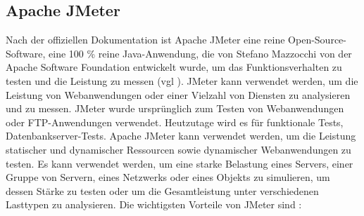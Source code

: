 \subsection{Apache JMeter}


Nach der offiziellen Dokumentation ist Apache JMeter eine reine
Open-Source-Software, eine 100 \% reine Java-Anwendung, die von Stefano
Mazzocchi von der Apache Software Foundation entwickelt wurde, um das
Funktionsverhalten zu testen und die Leistung zu messen (vgl \cite{jmeter}). JMeter kann
verwendet werden, um die Leistung von Webanwendungen oder einer Vielzahl
von Diensten zu analysieren und zu messen. JMeter wurde ursprünglich zum
Testen von Webanwendungen oder FTP-Anwendungen verwendet. Heutzutage wird
es für funktionale Tests, Datenbankserver-Tests. Apache JMeter kann
verwendet werden, um die Leistung statischer und dynamischer Ressourcen
sowie dynamischer Webanwendungen zu testen. Es kann verwendet werden, um
eine starke Belastung eines Servers, einer Gruppe von Servern, eines
Netzwerks oder eines Objekts zu simulieren, um dessen Stärke zu testen
oder um die Gesamtleistung unter verschiedenen Lasttypen zu analysieren.
Die wichtigsten Vorteile von JMeter sind :

